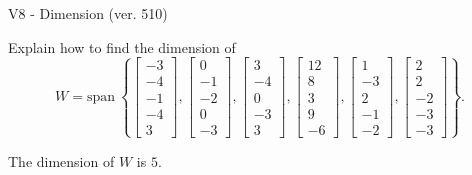 \begin{exercise}
  \begin{exerciseTitle}V8 - Dimension (ver. 510)\end{exerciseTitle}
  \begin{exerciseStatement}
    Explain how to find the dimension of 
\[W=\mathrm{span}\ \left\{\left[\begin{array}{r}
-3 \\
-4 \\
-1 \\
-4 \\
3
\end{array}\right] , \left[\begin{array}{r}
0 \\
-1 \\
-2 \\
0 \\
-3
\end{array}\right] , \left[\begin{array}{r}
3 \\
-4 \\
0 \\
-3 \\
3
\end{array}\right] , \left[\begin{array}{r}
12 \\
8 \\
3 \\
9 \\
-6
\end{array}\right] , \left[\begin{array}{r}
1 \\
-3 \\
2 \\
-1 \\
-2
\end{array}\right] , \left[\begin{array}{r}
2 \\
2 \\
-2 \\
-3 \\
-3
\end{array}\right]\right\}.\]



  \end{exerciseStatement}
  \begin{exerciseAnswer}
   The dimension of \(W\) is  \(5\).
  


  \end{exerciseAnswer}
\end{exercise}
